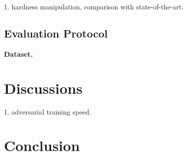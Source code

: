 \documentclass[10pt,twocolumn,letterpaper]{article}
\begin{document}
1. hardness manipulation, comparison with state-of-the-art.

\subsection{Evaluation Protocol}

\textbf{Dataset.}

\section{Discussions}
\label{sec:5}

1. adversarial training speed.

\section{Conclusion}
\label{sec:6}

\cite{Authors14}

{\small


}


\end{document}
